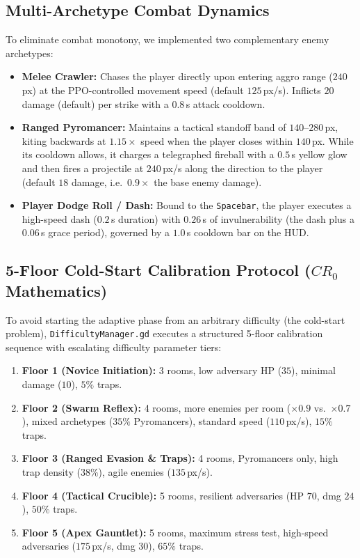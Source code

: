 \subsection{Multi-Archetype Combat Dynamics}
To eliminate combat monotony, we implemented two complementary enemy archetypes:
\begin{itemize}
    \item \textbf{Melee Crawler:} Chases the player directly upon entering aggro range ($240$\,px) at the PPO-controlled movement speed (default $125$\,px/s). Inflicts $20$ damage (default) per strike with a $0.8$\,s attack cooldown.
    \item \textbf{Ranged Pyromancer:} Maintains a tactical standoff band of $140$--$280$\,px, kiting backwards at $1.15\times$ speed when the player closes within $140$\,px. While its cooldown allows, it charges a telegraphed fireball with a $0.5$\,s yellow glow and then fires a projectile at $240$\,px/s along the direction to the player (default $18$ damage, i.e.\ $0.9\times$ the base enemy damage).
    \item \textbf{Player Dodge Roll / Dash:} Bound to the \texttt{Spacebar}, the player executes a high-speed dash ($0.2$\,s duration) with $0.26$\,s of invulnerability (the dash plus a $0.06$\,s grace period), governed by a $1.0$\,s cooldown bar on the HUD.
\end{itemize}

\subsection{5-Floor Cold-Start Calibration Protocol ($CR_0$ Mathematics)}
To avoid starting the adaptive phase from an arbitrary difficulty (the cold-start problem), \texttt{DifficultyManager.gd} executes a structured 5-floor calibration sequence with escalating difficulty parameter tiers:
\begin{enumerate}
    \item \textbf{Floor 1 (Novice Initiation):} 3 rooms, low adversary HP ($35$), minimal damage ($10$), $5\%$ traps.
    \item \textbf{Floor 2 (Swarm Reflex):} 4 rooms, more enemies per room ($\times0.9$ vs.\ $\times0.7$), mixed archetypes ($35\%$ Pyromancers), standard speed ($110$\,px/s), $15\%$ traps.
    \item \textbf{Floor 3 (Ranged Evasion \& Traps):} 4 rooms, Pyromancers only, high trap density ($38\%$), agile enemies ($135$\,px/s).
    \item \textbf{Floor 4 (Tactical Crucible):} 5 rooms, resilient adversaries (HP $70$, dmg $24$), $50\%$ traps.
    \item \textbf{Floor 5 (Apex Gauntlet):} 5 rooms, maximum stress test, high-speed adversaries ($175$\,px/s, dmg $30$), $65\%$ traps.
\end{enumerate}

